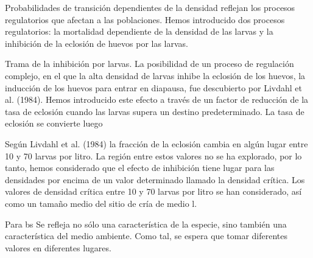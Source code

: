 Probabilidades de transición dependientes de la densidad reflejan los procesos regulatorios que afectan a las poblaciones. Hemos introducido dos procesos regulatorios: la mortalidad dependiente de la densidad de las larvas y la inhibición de la eclosión de huevos por las larvas.


Trama de la inhibición por larvas. La posibilidad de un proceso de regulación complejo, en el que la alta densidad de larvas inhibe la eclosión de los huevos, la inducción de los huevos para entrar en diapausa, fue descubierto por Livdahl et al. (1984). Hemos introducido este efecto a través de un factor de reducción de la tasa de eclosión cuando las larvas supera un destino predeterminado. La tasa de eclosión se convierte luego


Según Livdahl et al. (1984) la fracción de la eclosión cambia en algún lugar entre 10 y 70 larvas por litro. La región entre estos valores no se ha explorado, por lo tanto, hemos considerado que el efecto de inhibición tiene lugar para las densidades por encima de un valor determinado llamado la densidad crítica. Los valores de densidad crítica entre 10 y 70 larvas por litro se han considerado, así como un tamaño medio del sitio de cría de medio l.



Para bs Se refleja no sólo una característica de la especie, sino también una característica del medio ambiente. Como tal, se espera que tomar diferentes valores en diferentes lugares.
